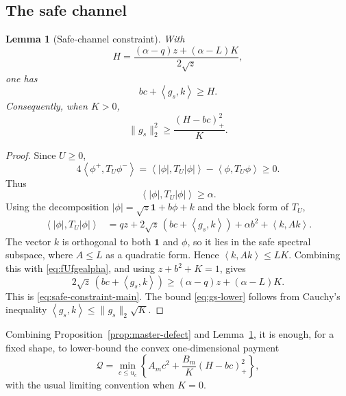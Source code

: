 \documentclass[11pt]{article}
\newtheorem{lemma}[theorem]{Lemma}
\newcommand{\one}{\mathbf 1}
\newcommand{\cQ}{\mathcal Q}
\newcommand{\pos}[1]{\left(#1\right)_{+}}
\newcommand{\ip}[2]{\left\langle #1,#2\right\rangle}
\begin{document}
\subsection{The safe channel}

\begin{lemma}[Safe-channel constraint]\label{lem:safe-channel}
With
\begin{equation}\label{eq:H-def}
        H=\frac{(\alpha-q)z+(\alpha-L)K}{2\sqrt z},
\end{equation}
one has
\begin{equation}\label{eq:safe-constraint-main}
        bc+\ip{g_s}{k}\ge H.
\end{equation}
Consequently, when $K>0$,
\begin{equation}\label{eq:gs-lower}
        \|g_s\|_2^2\ge \frac{\pos{H-bc}^2}{K}.
\end{equation}
\end{lemma}

\begin{proof}
Since $U\ge0$,
\[
        4\ip{\phi^+}{T_U\phi^-}
        =\ip{|\phi|}{T_U|\phi|}-\ip{\phi}{T_U\phi}\ge0.
\]
Thus
\begin{equation}\label{eq:fUfgealpha}
        \ip{|\phi|}{T_U|\phi|}\ge\alpha.
\end{equation}
Using the decomposition $|\phi|=\sqrt z\one+b\phi+k$ and the block form
of $T_U$,
\[
\begin{split}
 \ip{|\phi|}{T_U|\phi|}
 &=qz+2\sqrt z\,(bc+\ip{g_s}{k})+\alpha b^2+\ip{k}{Ak}.
\end{split}
\]
The vector $k$ is orthogonal to both $\one$ and $\phi$, so it lies in the
safe spectral subspace, where $A\le L$ as a quadratic form.  Hence
$\ip{k}{Ak}\le LK$.  Combining this with \eqref{eq:fUfgealpha}, and using
$z+b^2+K=1$, gives
\[
        2\sqrt z\,(bc+\ip{g_s}{k})
        \ge (\alpha-q)z+(\alpha-L)K.
\]
This is \eqref{eq:safe-constraint-main}.  The bound
\eqref{eq:gs-lower} follows from Cauchy's inequality
$\ip{g_s}{k}\le\|g_s\|_2\sqrt K$.
\end{proof}

Combining Proposition~\ref{prop:master-defect} and Lemma~\ref{lem:safe-channel},
it is enough, for a fixed shape, to lower-bound the convex one-dimensional
payment
\begin{equation}\label{eq:Qexact}
        \cQ=
        \min_{c\le u_c}
        \left\{
        A_m c^2+\frac{B_m}{K}\pos{H-bc}^2
        \right\},
\end{equation}
with the usual limiting convention when $K=0$.
\end{document}
